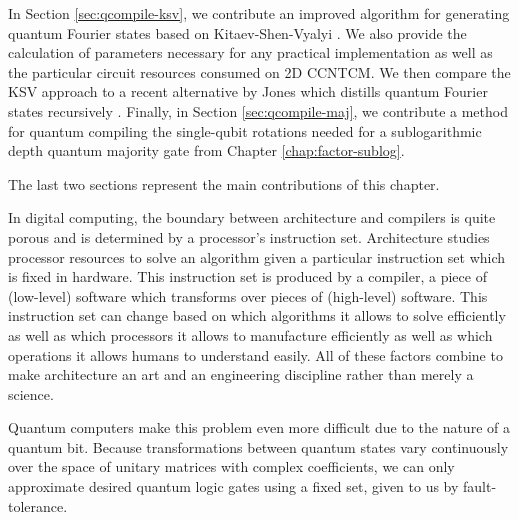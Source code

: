In Section \ref{sec:qcompile-ksv}, we contribute an improved
algorithm for generating quantum Fourier states based on
Kitaev-Shen-Vyalyi \cite{Kitaev2002}. We also provide the calculation of
parameters necessary for any practical implementation as well as
the particular circuit resources consumed on \textsf{2D CCNTCM}.
We then compare the KSV approach to a recent alternative
by Jones which distills quantum Fourier states recursively \cite{Jones2013}.
Finally, in Section \ref{sec:qcompile-maj}, we contribute a method for
quantum compiling the single-qubit rotations needed for a
sublogarithmic depth quantum majority gate from Chapter \ref{chap:factor-sublog}.

The last two sections represent the main contributions of this chapter.


%















In digital computing, the boundary between architecture and compilers is quite porous and is determined by a processor's instruction set. Architecture studies processor resources to solve an algorithm given a particular instruction set which is fixed in hardware. This instruction set is produced by a compiler, a piece of (low-level) software which transforms over pieces of (high-level) software. This instruction set can change based on which algorithms it allows to solve efficiently as well as which processors it allows to manufacture efficiently as well as which operations it allows humans to understand easily. All of these factors combine to make architecture an art and an engineering discipline rather than merely a science.

Quantum computers make this problem even more difficult due to the nature of a quantum bit. Because transformations between quantum states vary continuously over the space of unitary matrices with complex coefficients, we can only approximate desired quantum logic gates using a fixed set, given to us by fault-tolerance.


%